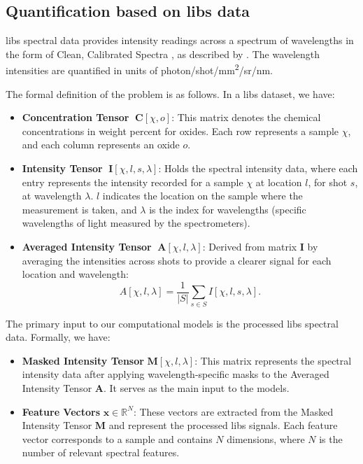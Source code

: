 \subsection{Quantification based on \gls{libs} data}
\gls{libs} spectral data provides intensity readings across a spectrum of wavelengths in the form of Clean, Calibrated Spectra \cite{andersonImprovedAccuracyQuantitative2017}, as described by \citet{wiensPreflightCalibrationInitial2013}.
The wavelength intensities are quantified in units of photon/shot/mm\textsuperscript{2}/sr/nm.

The formal definition of the problem is as follows.
In a \gls{libs} dataset, we have:
\begin{itemize}[topsep=0pt]
    \item \textbf{Concentration Tensor} $\;\mathbf{C}[\chi, o]$: This matrix denotes the chemical concentrations in weight percent for oxides. Each row represents a sample $\chi$, and each column represents an oxide $o$.
    \label{matrix:concentration}

    \item \textbf{Intensity Tensor} $\;\mathbf{I}[\chi, l, s, \lambda]$: Holds the spectral intensity data, where each entry represents the intensity recorded for a sample $\chi$ at location $l$, for shot $s$, at wavelength $\lambda$. $l$ indicates the location on the sample where the measurement is taken, and $\lambda$ is the index for wavelengths (specific wavelengths of light measured by the spectrometers).
    \label{matrix:intensity}

    \item \textbf{Averaged Intensity Tensor} $\;\mathbf{A}[\chi, l, \lambda]$: Derived from matrix $\mathbf{I}$ by averaging the intensities across shots to provide a clearer signal for each location and wavelength:
    \[
    A[\chi, l, \lambda] = \frac{1}{|S|} \sum_{s \in S} I[\chi, l, s, \lambda].
    \]
    \label{matrix:averaged_intensity}
\end{itemize}

The primary input to our computational models is the processed \gls{libs} spectral data.
Formally, we have:
\begin{itemize}
    \item \textbf{Masked Intensity Tensor} $\mathbf{M}[\chi, l, \lambda]$: This matrix represents the spectral intensity data after applying wavelength-specific masks to the Averaged Intensity Tensor $\mathbf{A}$. It serves as the main input to the models.
    \item \textbf{Feature Vectors} $\mathbf{x} \in \mathbb{R}^N$: These vectors are extracted from the Masked Intensity Tensor $\mathbf{M}$ and represent the processed \gls{libs} signals. Each feature vector corresponds to a sample and contains $N$ dimensions, where $N$ is the number of relevant spectral features.
\end{itemize}

